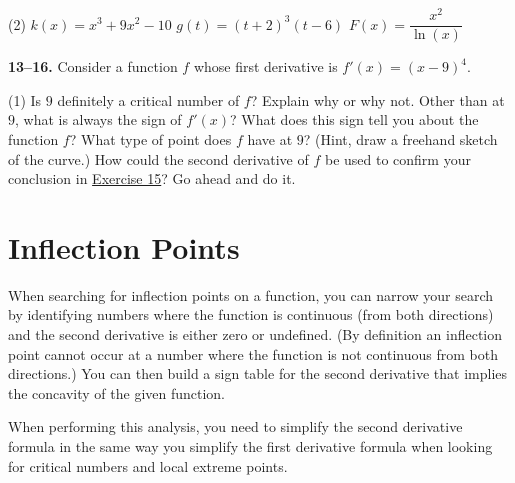 \documentclass[10pt,oneside,]{book}
\theoremstyle{plain}
\theoremstyle{definition}
\numberwithin{equation}{section}
\newcommand{\fe}[2]{#1\mathopen{}\left(#2\right)\mathclose{}}
\newcommand{\fd}[1]{#1'}
\begin{document}
\par
\begin{exercisegroup}(2)
\exercise[10.]\hypertarget{exercise-make-sign-table-first}{\null}\(\fe{k}{x}=x^3+9x^2-10\)%
\exercise[11.]\hypertarget{exercise-592}{\null}\(\fe{g}{t}=(t+2)^3(t-6)\)%
\exercise[12.]\hypertarget{exercise-make-sign-table-last}{\null}\(\fe{F}{x}=\dfrac{x^2}{\fe{\ln}{x}}\)%
\end{exercisegroup}
\par\smallskip\noindent
\textbf{13--16. }\hypertarget{exercisegroup-116}{\null}Consider a function \(f\) whose first derivative is \(\fe{\fd{f}}{x}=(x-9)^4\).%
\par
\begin{exercisegroup}(1)
\exercise[13.]\hypertarget{exercise-594}{\null}Is \(9\) definitely a critical number of \(f\)? Explain why or why not.%
\exercise[14.]\hypertarget{exercise-595}{\null}Other than at \(9\), what is always the sign of \(\fe{\fd{f}}{x}\)? What does this sign tell you about the function \(f\)?%
\exercise[15.]\hypertarget{exercise-what-type-of-critical-point}{\null}What type of point does \(f\) have at \(9\)? (Hint, draw a freehand sketch of the curve.)%
\exercise[16.]\hypertarget{exercise-597}{\null}How could the second derivative of \(f\) be used to confirm your conclusion in \hyperlink{exercise-what-type-of-critical-point}{Exercise 15}?  Go ahead and do it.%
\end{exercisegroup}
\par\smallskip\noindent
\typeout{************************************************}
\typeout{************************************************}
\section[Inflection Points]{Inflection Points}\label{section-inflection-points}
When searching for inflection points on a function, you can narrow your search by identifying numbers where the function is continuous (from both directions) and the second derivative is either zero or undefined.  (By definition an inflection point cannot occur at a number where the function is not continuous from both directions.)  You can then build a sign table for the second derivative that implies the concavity of the given function.%
\par
When performing this analysis, you need to simplify the second derivative formula in the same way you simplify the first derivative formula when looking for critical numbers and local extreme points.%
\typeout{************************************************}
\typeout{************************************************}
\end{document}
